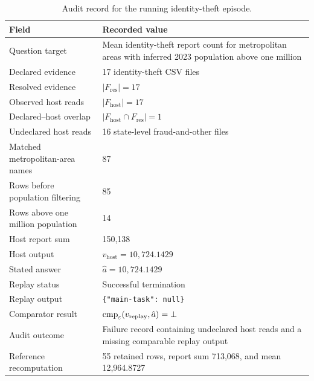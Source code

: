 \begin{table}[t]
\centering
\caption{Audit record for the running identity-theft episode.}
\label{tab:running-audit}
\scriptsize
\setlength{\tabcolsep}{3pt}
\renewcommand{\arraystretch}{1.06}
\begin{tabularx}{\columnwidth}{@{}lX@{}}
\toprule
Field & Recorded value \\
\midrule
Question target
& Mean identity-theft report count for metropolitan areas with
  inferred 2023 population above one million \\

Declared evidence
& 17 identity-theft CSV files \\

Resolved evidence
& $|F_{\mathrm{res}}|=17$ \\

Observed host reads
& $|F_{\mathrm{host}}|=17$ \\

Declared--host overlap
& $|F_{\mathrm{host}}\cap F_{\mathrm{res}}|=1$ \\

Undeclared host reads
& 16 state-level fraud-and-other files \\

Matched metropolitan-area names
& 87 \\

Rows before population filtering
& 85 \\

Rows above one million population
& 14 \\

Host report sum
& 150,138 \\

Host output
& $v_{\mathrm{host}}=10{,}724.1429$ \\

Stated answer
& $\hat a=10{,}724.1429$ \\

Replay status
& Successful termination \\

Replay output
& \texttt{\{"main-task": null\}} \\

Comparator result
& $\operatorname{cmp}_{\varepsilon}(v_{\mathrm{replay}},\hat a)=\bot$ \\

Audit outcome
& Failure record containing undeclared host reads and a missing
  comparable replay output \\

Reference recomputation
& 55 retained rows, report sum 713,068, and mean 12,964.8727 \\
\bottomrule
\end{tabularx}
\end{table}

